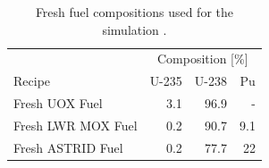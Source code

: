 \begin{table}[h]
    \centering
    \caption{Fresh fuel compositions used for the simulation \cite{wilson_adoption_2009, varaine_pre-conceptual_2012}.}
        \begin{tabular}{lrrr}
            \hline
             & \multicolumn{3}{c}{ Composition [\%]} \\
            Recipe & U-235  & U-238  & Pu \\ 
            \hline
            Fresh \gls{UOX} Fuel & 3.1 & 96.9 & -   \\ 
            Fresh \gls{LWR} \gls{MOX} Fuel & 0.2 & 90.7 & 9.1 \\ 
            Fresh \gls{ASTRID} Fuel & 0.2 & 77.7 & 22 \\
            \hline
        \end{tabular}
        
        \label{tab:sim_result}
\end {table}
